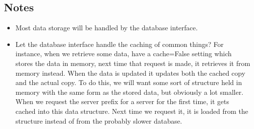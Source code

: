 \documentclass[a4paper]{amsart}
\begin{document}
\subsection{Notes}
\begin{itemize}
    \item Most data storage will be handled by the database interface.
    \item Let the database interface handle the caching of common things? For instance, when we retrieve some data, have a cache=False setting which stores the data in memory, next time that request is made, it retrieves it from memory instead. When the data is updated it updates both the cached copy and the actual copy. To do this, we will want some sort of structure held in memory with the same form as the stored data, but obviously a lot smaller. When we request the server prefix for a server for the first time, it gets cached into this data structure. Next time we request it, it is loaded from the structure instead of from the probably slower database.
\end{itemize}
\end{document}
